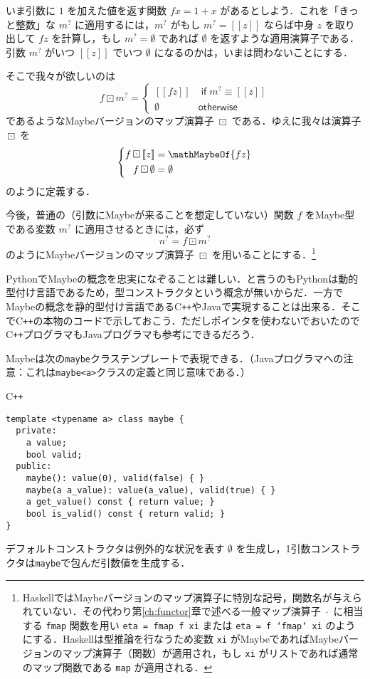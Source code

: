 \documentclass[a4paper,draft]{jsbook}
\def\[{\left[\!\left[}
\def\]{\right]\!\right]}
\newcommand{\programminglanguage}[1]{\textsf{#1}}
\newcommand{\cxx}{\programminglanguage{C}\texttt{++}}
\newcommand{\haskell}{\programminglanguage{Haskell}}
\newcommand{\java}{\programminglanguage{Java}}
\newcommand{\python}{\programminglanguage{Python}}
\newcommand{\code}[1]{\texttt{#1}}
\newenvironment{cxxcode}{\begin{itembox}[r]{\cxx}}{\end{itembox}}
\newcommand{\mNothing}{\emptyset}
\newcommand{\mKeyword}[1]{\mathsf{#1}}
\newcommand{\mIfKeyword}{\mKeyword{if}}
\newcommand{\mOtherwiseKeyword}{\mKeyword{otherwise}}
\newcommand{\mMaybeOf}[1]{\[#1\]}
\newcommand{\mMaybeVar}[1]{{#1}^\text{?}}
\DeclareMathOperator{\mMap}{\cdot}
\DeclareMathOperator{\mMapMaybe}{\boxdot}
\DeclareMathOperator{\mIf}{\mIfKeyword}
\DeclareMathOperator{\mOtherwise}{\mOtherwiseKeyword}
\begin{document}
いま引数に $1$ を加えた値を返す関数 $fx=1+x$ があるとしよう．これを「きっと整数」な $\mMaybeVar{m}$ に適用するには，$\mMaybeVar{m}$ がもし $\mMaybeVar{m}=\mMaybeOf{z}$ ならば中身 $z$ を取り出して $fz$ を計算し，もし $\mMaybeVar{m}=\mNothing$ であれば $\mNothing$ を返すような適用演算子である．引数 $\mMaybeVar{m}$ がいつ $\mMaybeOf{z}$ でいつ $\mNothing$ になるのかは，いまは問わないことにする．

そこで我々が欲しいのは
\begin{equation}
f\mMapMaybe\mMaybeVar{m}=\begin{cases}
\mMaybeOf{fz}&\mIf\mMaybeVar{m}\equiv\mMaybeOf{z}\\
\mNothing&\mOtherwise
\end{cases}
\end{equation}
であるようなMaybeバージョンのマップ演算子 $\mMapMaybe$ である．ゆえに我々は演算子 $\mMapMaybe$ を
\begin{equation}
\left\{
\begin{split}
f\mMapMaybe\mMaybeOf{z}&=\mathMaybeOf{fz}\\
f\mMapMaybe\mNothing&=\mNothing
\end{split}
\right.
\end{equation}
のように定義する．

今後，普通の（引数にMaybeが来ることを想定していない）関数 $f$ をMaybe型である変数 $\mMaybeVar{m}$ に適用させるときには，必ず
\begin{equation}
\mMaybeVar{n}=f\mMapMaybe\mMaybeVar{m}
\end{equation}
のようにMaybeバージョンのマップ演算子 $\mMapMaybe$ を用いることにする．\footnote{\haskell ではMaybeバージョンのマップ演算子に特別な記号，関数名が与えられていない．その代わり第\ref{ch:functor}章で述べる一般マップ演算子 $\mMap$ に相当する \code{fmap} 関数を用い \code{eta = fmap f xi} または \code{eta = f `fmap` xi} のようにする．\haskell は型推論を行なうため変数 \code{xi} がMaybeであればMaybeバージョンのマップ演算子（関数）が適用され，もし \code{xi} がリストであれば通常のマップ関数である \code{map} が適用される．}

\python でMaybeの概念を忠実になぞることは難しい．と言うのも\python は動的型付け言語であるため，型コンストラクタという概念が無いからだ．一方でMaybeの概念を静的型付け言語である\cxx や\java で実現することは出来る．そこで\cxx の本物のコードで示しておこう．ただしポインタを使わないでおいたので\cxx プログラマも\java プログラマも参考にできるだろう．

Maybeは次の\code{maybe}クラステンプレートで表現できる．（\java プログラマへの注意：これは\code{maybe<a>}クラスの定義と同じ意味である．）
\begin{cxxcode}
\begin{verbatim}
template <typename a> class maybe {
  private:
    a value;
    bool valid;
  public:
    maybe(): value(0), valid(false) { }
    maybe(a a_value): value(a_value), valid(true) { }
    a get_value() const { return value; }
    bool is_valid() const { return valid; }
}
\end{verbatim}
\end{cxxcode}
デフォルトコンストラクタは例外的な状況を表す $\mNothing$ を生成し，1引数コンストラクタは\code{maybe}で包んだ引数値を生成する．
\end{document}
